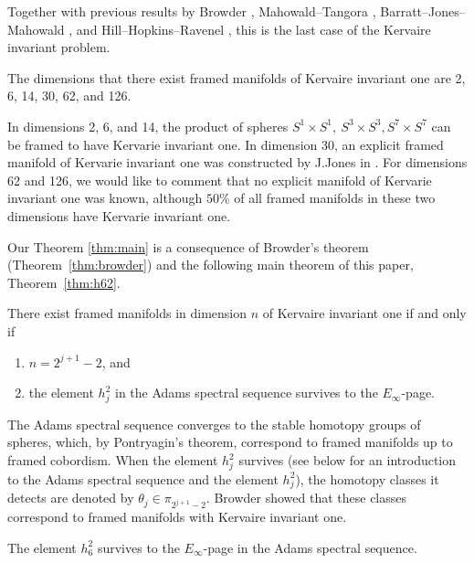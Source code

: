 Together with previous results by Browder \cite{Browder}, Mahowald--Tangora \cite{MahowaldTangora}, Barratt--Jones--Mahowald \cite{BJMtheta5}, and Hill--Hopkins--Ravenel \cite{HHR}, this is the last case of the Kervaire invariant problem.

\begin{corollary}\label{cor:kervaire-dimensions}
  The dimensions that there exist framed manifolds of Kervaire invariant one are 2, 6, 14, 30, 62, and 126.
\end{corollary}

In dimensions 2, 6, and 14, the product of spheres $S^1 \times S^1, \ S^3 \times S^3, S^7 \times S^7$ can be framed to have Kervarie invariant one.
In dimension 30, an explicit framed manifold of Kervarie invariant one was constructed by J.Jones in \cite{Jones30}. For dimensions 62 and 126, we would like to comment that no explicit manifold of Kervarie invariant one was known, although $50\%$ of all framed manifolds in these two dimensions have Kervarie invariant one.

Our Theorem \ref{thm:main} is a consequence of Browder's theorem (Theorem~\ref{thm:browder}) and the following main theorem of this paper, Theorem~\ref{thm:h62}. 

\begin{theorem} \label{thm:browder}
   There exist framed manifolds in dimension $n$ of Kervaire invariant one if and only if
   \begin{enumerate}
       \item $n=2^{j+1}-2$, and
       \item the element $h_j^2$ in the Adams spectral sequence survives to the $E_\infty$-page.
   \end{enumerate}
\end{theorem}


The Adams spectral sequence \cite{Adams58} converges to the stable homotopy groups of spheres, which, by Pontryagin's theorem, correspond to framed manifolds up to framed cobordism. When the element $h_j^2$ survives (see below for an introduction to the Adams spectral sequence and the element $h_j^2$), the homotopy classes it detects are denoted by $\theta_j \in \pi_{2^{j+1}-2}$. Browder showed that these classes correspond to framed manifolds with Kervaire invariant one. 

\begin{theorem} \label{thm:h62}
    The element $h_6^2$ survives to the $E_\infty$-page in the Adams spectral sequence.
\end{theorem}

